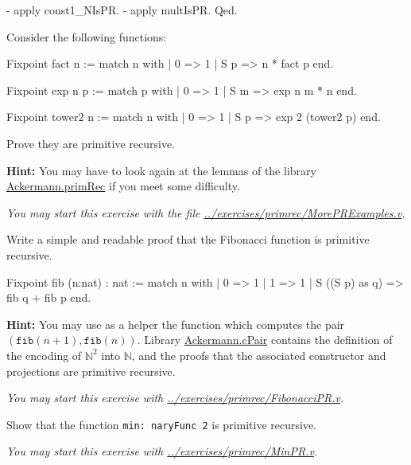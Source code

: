  \begin{Coqsrc}
  - apply const1_NIsPR.
  - apply multIsPR.
Qed.
\end{Coqsrc}

\begin{exercise}
Consider the following functions:

\begin{Coqsrc}
Fixpoint fact n :=
  match n with 
          | 0 => 1
          | S p  => n * fact p
  end.

Fixpoint exp n p :=
  match p with
  | 0 => 1
  | S m =>  exp n m * n
  end.

Fixpoint tower2 n :=
  match n with
  | 0 => 1
  | S p => exp 2 (tower2 p)
  end.
\end{Coqsrc}

Prove they are primitive recursive.

\textbf{Hint:} You may have to look again at the lemmas of the library
\href{../theories/html/hydras.Ackermann.primRec.html}{Ackermann.primRec} if you meet some difficulty.

\emph{You may start this exercise with the file
\url{../exercises/primrec/MorePRExamples.v}.}
\end{exercise}








\begin{exercise}
Write a simple and readable proof that the Fibonacci function is primitive recursive.


\begin{Coqsrc}
Fixpoint fib (n:nat) : nat :=
  match n with
  | 0 => 1
  | 1 => 1
  | S ((S p) as q) => fib q + fib p
  end.
\end{Coqsrc}

\textbf{Hint:}  You may use as a helper the function which computes the pair 
$(\texttt{fib}(n+1),\texttt{fib}(n))$. 
Library \href{../theories/html/hydras.Ackermann.cPair.html}{Ackermann.cPair} contains
the definition of the encoding of $\mathbb{N}^2$ into $\mathbb{N}$, and the proofs that 
the associated constructor and projections are primitive recursive.

\emph{You may start this exercise with
\url{../exercises/primrec/FibonacciPR.v}.}

\end{exercise}

\begin{exercise}
Show that the function \texttt{min: naryFunc\,2} is primitive
recursive.

\emph{You may start this exercise with
\url{../exercises/primrec/MinPR.v}.}

\end{exercise}


